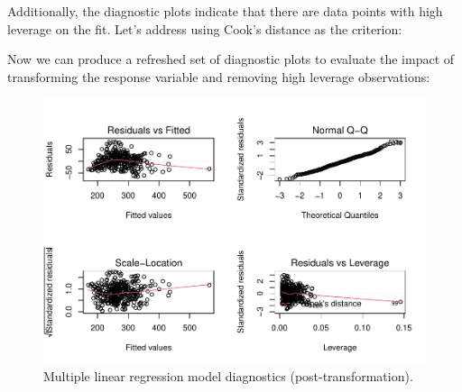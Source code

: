 \documentclass[
]{book}
\newenvironment{Shaded}{\begin{snugshade}}{\end{snugshade}}
\newcommand{\AttributeTok}[1]{\textcolor[rgb]{0.77,0.63,0.00}{#1}}
\newcommand{\CommentTok}[1]{\textcolor[rgb]{0.56,0.35,0.01}{\textit{#1}}}
\newcommand{\DecValTok}[1]{\textcolor[rgb]{0.00,0.00,0.81}{#1}}
\newcommand{\FunctionTok}[1]{\textcolor[rgb]{0.00,0.00,0.00}{#1}}
\newcommand{\NormalTok}[1]{#1}
\newcommand{\OtherTok}[1]{\textcolor[rgb]{0.56,0.35,0.01}{#1}}
\newcommand{\SpecialCharTok}[1]{\textcolor[rgb]{0.00,0.00,0.00}{#1}}
\begin{document}
Additionally, the diagnostic plots indicate that there are data points with high leverage on the fit. Let's address using Cook's distance as the criterion:

\begin{Shaded}
\end{Shaded}

Now we can produce a refreshed set of diagnostic plots to evaluate the impact of transforming the response variable and removing high leverage observations:

\begin{figure}

{\centering \includegraphics[width=1\linewidth]{People_Analytics_Lifecycle_files/figure-latex/post-mlm-diagnostics-1} 

}

\caption{Multiple linear regression model diagnostics (post-transformation).}\label{fig:post-mlm-diagnostics}
\end{figure}
\end{document}
